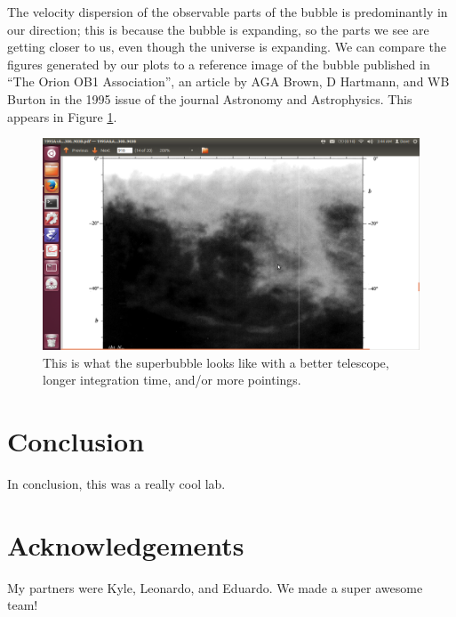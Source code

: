 \documentclass[11pt]{article}
\begin{document}
The velocity dispersion of the observable parts of the bubble is predominantly in our direction; this is because the bubble is expanding, so the parts we see are getting closer to us, even though the universe is expanding. We can compare the figures generated by our plots to a reference image of the bubble published in ``The Orion OB1 Association'', an article by AGA Brown, D Hartmann, and WB Burton in the 1995 issue of the journal Astronomy and Astrophysics. This appears in Figure \ref{canon}.

\begin{figure}
\centering
\includegraphics[scale=0.35]{garphs/superbubble}
\caption{This is what the superbubble looks like with a better telescope, longer integration time, and/or more pointings.  \label{canon}}
\end{figure} 

\section{Conclusion}
In conclusion, this was a really cool lab. 
\section{Acknowledgements}
My partners were Kyle, Leonardo, and Eduardo. We made a super awesome team!
\end{document}
